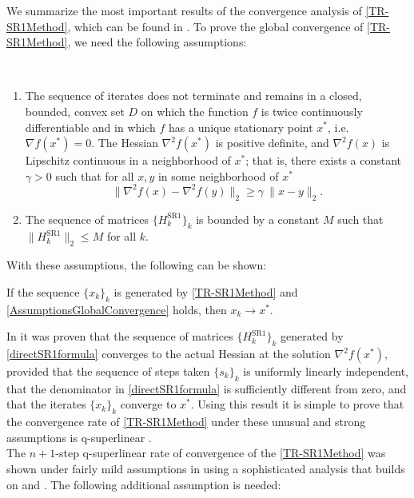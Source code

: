 We summarize the most important results of the convergence analysis of \cref{TR-SR1Method}, which can be found in \cite{ByrdKhalfanSchnabel:1996}. To prove the global convergence of \cref{TR-SR1Method}, we need the following assumptions:  
\begin{assumption}\label{AssumptionsGlobalConvergence} \ \\[-1.5\baselineskip]
    \begin{enumerate}
        \item The sequence of iterates does not terminate and remains in a closed, bounded, convex set $D$ on which the function $f$ is twice continuously differentiable and in which $f$ has a unique stationary point $x^*$, i.e. $\nabla f(x^*) = 0$. The Hessian $\nabla^2 f(x^*)$ is positive definite, and $\nabla^2 f(x)$ is Lipschitz continuous in a neighborhood of $x^*$; that is, there exists a constant $\gamma > 0$ such that for all $x, y$ in some neighborhood of $x^*$ \begin{equation*} \lVert \nabla^2 f(x) - \nabla^2 f(y) \rVert_2 \geq \gamma \ \lVert x - y \rVert_2. \end{equation*}
        \item The sequence of matrices $\{ H^{\mathrm{SR1}}_k \}_k$ is bounded by a constant $M$ such that $\lVert H^{\mathrm{SR1}}_k \rVert_2 \leq M$ for all $k$.
    \end{enumerate}
\end{assumption}
With these assumptions, the following can be shown: 
\begin{theorem} \label{GlobalConvergence}
    If the sequence $\{ x_k \}_k$ is generated by \cref{TR-SR1Method} and \cref{AssumptionsGlobalConvergence} holds, then $x_k \rightarrow x^*$.
\end{theorem}
In \cite{ConnGouldToint:1991} it was proven that the sequence of matrices $\{ H^{\mathrm{SR1}}_k \}_k$ generated by \cref{directSR1formula} converges to the actual Hessian at the solution $\nabla^2 f(x^*)$, provided that the sequence of steps taken $\{ s_k \}_k$ is uniformly linearly independent, that the denominator in \cref{directSR1formula} is sufficiently different from zero, and that the iterates $\{ x_k \}_k$ converge to $x^*$. Using this result it is simple to prove that the convergence rate of \cref{TR-SR1Method} under these unusual and strong assumptions is q-superlinear \cite[p.~1026]{ByrdKhalfanSchnabel:1996}. \\
The $n+1$-step q-superlinear rate of convergence of the \cref{TR-SR1Method} was shown under fairly mild assumptions in \cite{ByrdKhalfanSchnabel:1996} using a sophisticated analysis that builds on \cite{ConnGouldToint:1991} and \cite{KhalfanByrdSchnabel:1993}. The following additional assumption is needed: 
